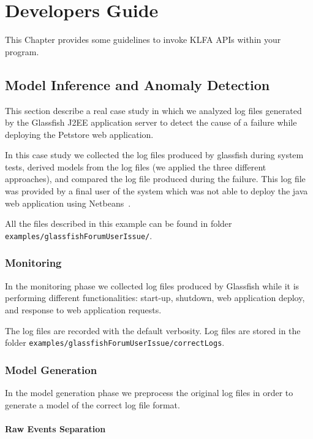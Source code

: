 \chapter{Developers Guide}

This Chapter provides some guidelines to invoke KLFA APIs within your program.

\section{Model Inference and Anomaly Detection}

This section describe a real case study in which we analyzed log
files generated by the Glassfish J2EE application server to detect
the cause of a failure while deploying the Petstore\cite{petstore} web
application.

In this case study we collected the log files produced by glassfish
during system tests, derived models from the log files (we applied
the three different approaches), and compared the log file produced
during the failure. This log file was provided by a final user of the
system which was not able to deploy the java web application using
Netbeans~\cite{GNetbeansCaseStudy:WEBSITE:2008}.

All the files described in this example can be found in folder \newline
\texttt{examples/glassfishForumUserIssue/}.

\subsection{Monitoring}

In the monitoring phase we collected log files produced by Glassfish
while it is performing different functionalities: start-up, shutdown,
web application deploy, and response to web application requests.

The log files are recorded with the default verbosity. Log files are
stored in the folder
\texttt{examples/glassfish\-ForumUserIssue/correctLogs}.



\subsection{Model Generation}

In the model generation phase we preprocess the original log files in
order to generate a model of the correct log file format.

\subsubsection*{Raw Events Separation}


